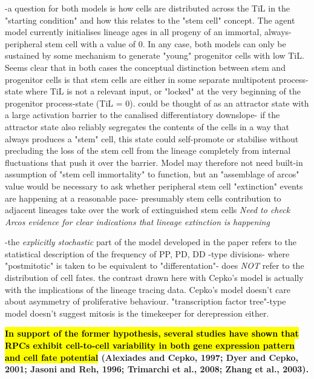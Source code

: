 -a question for both models is how cells are distributed across the TiL in the "starting condition" and how this relates to the "stem cell" concept. The agent model currently initialises lineage ages in all progeny of an immortal, always-peripheral stem cell with a value of 0. In any case, both models can only be sustained by some mechanism to generate "young" progenitor cells with low TiL. Seems clear that in both cases the conceptual distinction between stem and progenitor cells is that stem cells are either in some separate multipotent process-state where TiL is not a relevant input, or "locked" at the very beginning of the progenitor process-state (TiL = 0). could be thought of as an attractor state with a large activation barrier to the canalised differentiatory downslope- if the attractor state also reliably segregates the contents of the cells in a way that always produces a "stem" cell, this state could self-promote or stabilise without precluding the loss of the stem cell from the lineage completely from internal fluctuations that push it over the barrier. Model may therefore not need built-in assumption of "stem cell immortality" to function, but an "assemblage of arcos" value would be necessary to ask whether peripheral stem cell "extinction" events are happening at a reasonable pace- presumably stem cells contribution to adjacent lineages take over the work of extinguished stem cells \textit{Need to check Arcos evidence for clear indications that lineage extinction is happening}

-the \textit{explicitly stochastic} part of the model developed in the paper refers to the statistical description of the frequency of PP, PD, DD -type divisions- where "postmitotic" is taken to be equivalent to "differentation"- does \textit{NOT} refer to the distribution of cell fates. the contrast drawn here with Cepko's model is actually with the implications of the lineage tracing data. Cepko's model doesn't care about asymmetry of proliferative behaviour. "transcription factor tree"-type model \cite{Vitorino2009} doesn't suggest mitosis is the timekeeper for derepression either.

\bigskip

\textbf{\hl{In support of the former hypothesis, several
studies have shown that RPCs exhibit cell-to-cell variability in
both gene expression pattern and cell fate potential} (Alexiades
and Cepko, 1997; Dyer and Cepko, 2001; Jasoni and Reh,
1996; Trimarchi et al., 2008; Zhang et al., 2003).}

\bigskip

